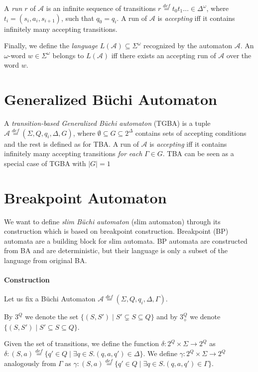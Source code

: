 \documentclass[
	digital
nolof, nolot
]{fithesis3}
\newcommand{\cA}{\mathcal{A}}
\newcommand{\cD}{\mathcal{D}}
\newcommand{\lA}{L(\cA)}
\newcommand{\lD}{L(\cD)}
\newcommand{\eqdef}{\overset{def}{=}}
\begin{document}
			A \emph{run} $r$ of $\cA$ is an infinite sequence of transitions
			$r\eqdef t_0t_1\ldots\in\Delta^\omega$, where $t_i=(s_i, a_i,s_{i+1})$,
			 such that $q_0=q_i$.
			A run of $\cA$ is \emph{accepting} iff it contains infinitely many accepting transitions.

			Finally, we define the \emph{language} $\lA \subseteq \Sigma^\omega$ recognized by the automaton $\cA$. An $\omega$-word $w \in \Sigma^\omega$ belongs to $\lA$ iff there exists an accepting run of $\cA$ over the word $w$. 
			
			
		\section{Generalized Büchi Automaton}
		A \emph{transition-based Generalized Büchi automaton} (TGBA) is a tuple $\cA\eqdef(\Sigma, Q, q_i, \Delta, G)$, where $\emptyset \subseteq G \subseteq 2^\Delta$ contains sets of accepting conditions and the rest is defined as for TBA. A run of $\cA$ is \emph{accepting} iff it contains infinitely many accepting transitions \emph{for each} $\Gamma \in G$. TBA can be seen as a special case of TGBA with $|G|=1$
		
		\section{Breakpoint Automaton}
		We want to define \emph{slim Büchi automaton} (slim automaton) through its construction which is based on breakpoint construction.
		Breakpoint (BP) automata are a building block for slim automata. BP automata are constructed from BA and are deterministic, but their language is only a subset of the language from original BA. 
		
		\paragraph{Construction}
		Let us fix a Büchi Automaton $\cA\eqdef(\Sigma, Q, q_i, \Delta, \Gamma)$. 
		
		By $3^Q$ we denote the set $\{(S,S') \mid S'\subsetneq S \subseteq Q\}$ and
		by $3^Q_+$ we denote $\{(S,S') \mid S'\subseteq S \subseteq Q\}$.
		
		
		Given the set of transitions, we define the function $\delta \colon 2^Q \times \Sigma \rightarrow 2^Q$ as 	
			$\delta\colon (S,a)\eqdef\{q'\in Q \mid \exists q \in S.(q,a,q') \in \Delta\}$. We define $\gamma:2^Q  \times \Sigma \rightarrow 2^Q$ analogously from $\Gamma$ as $\gamma: (S,a)\eqdef\{q'\in Q \mid \exists q \in S.(q,a,q') \in \Gamma\}$.
			
\end{document}
